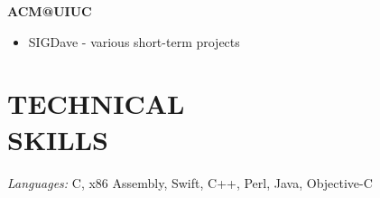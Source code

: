 \documentclass[resmargin]{res}
\begin{document}
\begin{resume}
\vspace{-5mm}
{\bf ACM@UIUC}
\begin{itemize} \itemsep -2pt
 \item SIGDave - various short-term projects
\end{itemize} 

\vspace{-3mm}
\section{TECHNICAL \\ SKILLS} {\sl Languages:} C, x86 Assembly, Swift, C++, Perl, Java, Objective-C

\end{resume}
\end{document}
